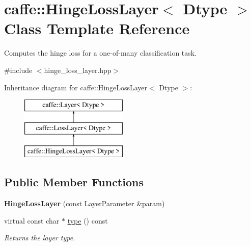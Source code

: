 \hypertarget{classcaffe_1_1HingeLossLayer}{}\section{caffe\+:\+:Hinge\+Loss\+Layer$<$ Dtype $>$ Class Template Reference}
\label{classcaffe_1_1HingeLossLayer}


Computes the hinge loss for a one-\/of-\/many classification task.  




{\ttfamily \#include $<$hinge\+\_\+loss\+\_\+layer.\+hpp$>$}

Inheritance diagram for caffe\+:\+:Hinge\+Loss\+Layer$<$ Dtype $>$\+:\begin{figure}[H]
\begin{center}
\leavevmode
\includegraphics[height=3.000000cm]{classcaffe_1_1HingeLossLayer}
\end{center}
\end{figure}
\subsection*{Public Member Functions}
\begin{DoxyCompactItemize}
\item 
{\bfseries Hinge\+Loss\+Layer} (const Layer\+Parameter \&param)\hypertarget{classcaffe_1_1HingeLossLayer_a358a5bd2625bb7fed61052dd8e1cb588}{}\label{classcaffe_1_1HingeLossLayer_a358a5bd2625bb7fed61052dd8e1cb588}

\item 
virtual const char $\ast$ \hyperlink{classcaffe_1_1HingeLossLayer_ae804bb931e8cf835ac77a0529f89463f}{type} () const \hypertarget{classcaffe_1_1HingeLossLayer_ae804bb931e8cf835ac77a0529f89463f}{}\label{classcaffe_1_1HingeLossLayer_ae804bb931e8cf835ac77a0529f89463f}

\begin{DoxyCompactList}\small\item\em Returns the layer type. \end{DoxyCompactList}\end{DoxyCompactItemize}
